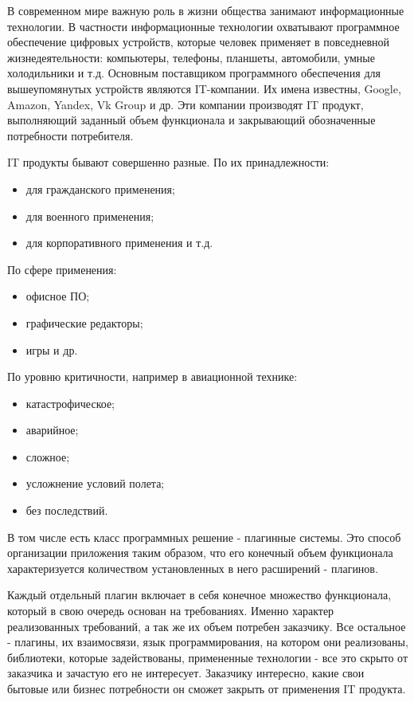 В современном мире важную роль в жизни общества занимают информационные технологии. В частности информационные технологии охватывают программное обеспечение цифровых устройств, которые человек применяет в повседневной жизнедеятельности: компьютеры, телефоны, планшеты, автомобили, умные холодильники и т.д. Основным поставщиком программного обеспечения для вышеупомянутых устройств являются IT-компании. Их имена известны, Google, Amazon, Yandex, Vk Group и др. Эти компании производят IT продукт, выполняющий заданный объем функционала и закрывающий обозначенные потребности потребителя.

IT продукты бывают совершенно разные. По их принадлежности:
\begin{itemize}
    \item для гражданского применения;
    \item для военного применения;
    \item для корпоративного применения и т.д.
\end{itemize}
По сфере применения:
\begin{itemize}
    \item офисное ПО;
    \item графические редакторы;
    \item игры и др.
\end{itemize}
По уровню критичности, например в авиационной технике:
\begin{itemize}
    \item катастрофическое;
    \item аварийное;
    \item сложное;
    \item усложнение условий полета;
    \item без последствий.
\end{itemize}

В том числе есть класс программных решение - плагинные системы. Это способ организации приложения таким образом, что его конечный объем функционала характеризуется количеством установленных в него расширений - плагинов.

Каждый отдельный плагин включает в себя конечное множество функционала, который в свою очередь основан на требованиях. Именно характер реализованных требований, а так же их объем потребен заказчику. Все остальное - плагины, их взаимосвязи, язык программирования, на котором они реализованы, библиотеки, которые задействованы, примененные технологии - все это скрыто от заказчика и зачастую его не интересует. Заказчику интересно, какие свои бытовые или бизнес потребности он сможет закрыть от применения IT продукта.

